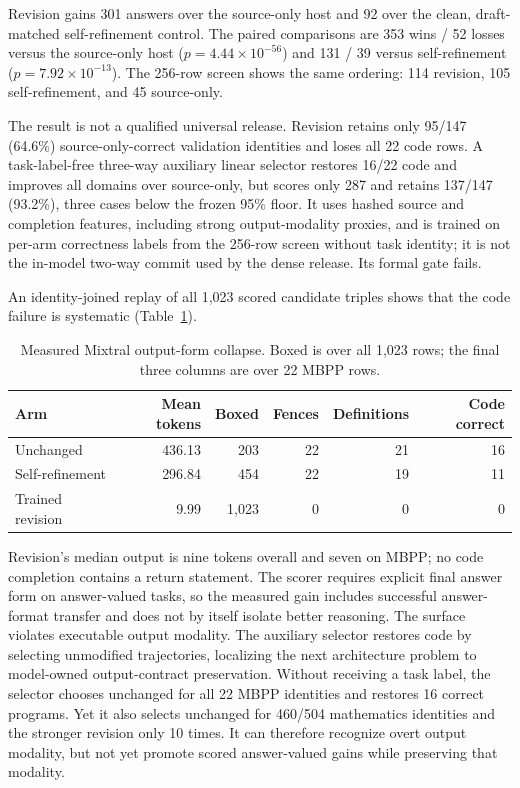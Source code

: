 \documentclass[10pt]{article}
\begin{document}
Revision gains 301 answers over the source-only host and 92 over the clean,
draft-matched self-refinement control. The paired comparisons are 353 wins /
52 losses versus the source-only host ($p=4.44\times10^{-56}$) and 131 / 39
versus self-refinement ($p=7.92\times10^{-13}$). The 256-row screen shows the
same ordering: 114 revision, 105 self-refinement, and 45 source-only.

The result is not a qualified universal release. Revision retains only 95/147
(64.6\%) source-only-correct validation identities and loses all 22 code rows.
A task-label-free three-way auxiliary linear selector restores 16/22 code and
improves all domains over source-only, but scores only 287 and retains 137/147
(93.2\%), three cases below the frozen 95\% floor. It uses hashed source and
completion features, including strong output-modality proxies, and is trained
on per-arm correctness labels from the 256-row screen without task identity;
it is not the in-model two-way commit used by the dense release. Its formal
gate fails.

An identity-joined replay of all 1,023 scored candidate triples shows that the
code failure is systematic (Table~\ref{tab:format}).

\begin{table}[h]
\centering
\small
\caption{Measured Mixtral output-form collapse. Boxed is over all 1,023 rows;
the final three columns are over 22 MBPP rows.}
\begin{tabular}{lrrrrr}
\toprule
Arm & Mean tokens & Boxed & Fences & Definitions & Code correct\\
\midrule
Unchanged & 436.13 & 203 & 22 & 21 & 16\\
Self-refinement & 296.84 & 454 & 22 & 19 & 11\\
Trained revision & 9.99 & 1,023 & 0 & 0 & 0\\
\bottomrule
\end{tabular}
\label{tab:format}
\end{table}

Revision's median output is nine tokens overall and seven on MBPP; no code
completion contains a return statement. The scorer requires explicit final
answer form on answer-valued tasks, so the measured gain includes successful
answer-format transfer and does not by itself isolate better reasoning. The
surface violates executable output modality. The auxiliary selector restores
code by selecting unmodified trajectories, localizing the next architecture
problem to model-owned output-contract preservation. Without receiving a task
label, the selector chooses unchanged for all 22 MBPP
identities and restores 16 correct programs. Yet it also selects unchanged for
460/504 mathematics identities and the stronger revision only 10 times. It can
therefore recognize overt output modality, but not yet promote scored
answer-valued gains while preserving that modality.
\end{document}

